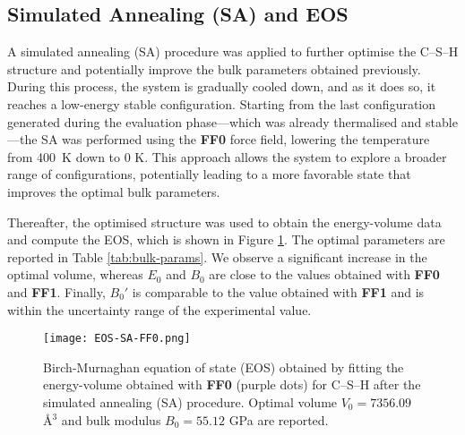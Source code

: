 \subsection{Simulated Annealing (SA) and EOS}
A simulated annealing (SA) procedure was applied to further optimise the C--S--H structure and potentially improve the bulk parameters obtained previously. During this process, the system is gradually cooled down, and as it does so, it reaches a low-energy stable configuration. Starting from the last configuration generated during the evaluation phase---which was already thermalised and stable---the SA was performed using the \textbf{FF0} force field, lowering the temperature from 400~K down to 0 K. This approach allows the system to explore a broader range of configurations, potentially leading to a more favorable state that improves the optimal bulk parameters.

Thereafter, the optimised structure was used to obtain the energy-volume data and compute the EOS, which is shown in Figure \ref{fig:eos-sa-ff0}. The optimal parameters are reported in Table \ref{tab:bulk-params}. We observe a significant increase in the optimal volume, whereas $E_0$ and $B_0$ are close to the values obtained with \textbf{FF0} and \textbf{FF1}. Finally, $B_0'$ is comparable to the value obtained with \textbf{FF1} and is within the uncertainty range of the experimental value.
\begin{figure}[H]
    \centering
    \texttt{[image: EOS-SA-FF0.png]}
    \caption{
    Birch-Murnaghan equation of state (EOS) obtained by fitting the energy-volume obtained with \textbf{FF0} (purple dots) for C--S--H after the simulated annealing (SA) procedure. Optimal volume $V_0=7356.09$ \AA$^3$ and bulk modulus $B_0=55.12$ GPa are reported.
    }
    \label{fig:eos-sa-ff0}
\end{figure}

